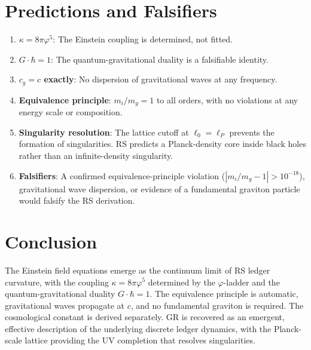 \documentclass[12pt,a4paper]{article}
\theoremstyle{definition}
\theoremstyle{remark}
\begin{document}
\section{Predictions and Falsifiers}
\label{sec:predictions}

\begin{enumerate}
  \item \textbf{$\kappa = 8\pi\varphi^5$}: The Einstein
  coupling is determined, not fitted.

  \item \textbf{$G \cdot \hbar = 1$}: The quantum-gravitational
  duality is a falsifiable identity.

  \item \textbf{$c_g = c$ exactly}: No dispersion of
  gravitational waves at any frequency.

  \item \textbf{Equivalence principle}: $m_i/m_g = 1$ to all
  orders, with no violations at any energy scale or
  composition.

  \item \textbf{Singularity resolution}: The lattice cutoff
  at $\ell_0 = \ell_P$ prevents the formation of
  singularities.  RS predicts a Planck-density core inside
  black holes rather than an infinite-density singularity.

  \item \textbf{Falsifiers}: A confirmed equivalence-principle
  violation ($|m_i/m_g - 1| > 10^{-18}$), gravitational
  wave dispersion, or evidence of a fundamental graviton
  particle would falsify the RS derivation.
\end{enumerate}

\section{Conclusion}
\label{sec:conclusion}

The Einstein field equations emerge as the continuum limit
of RS ledger curvature, with the coupling
$\kappa = 8\pi\varphi^5$ determined by the $\varphi$-ladder
and the quantum-gravitational duality $G \cdot \hbar = 1$.
The equivalence principle is automatic, gravitational waves
propagate at $c$, and no fundamental graviton is required.
The cosmological constant is derived separately.  GR is
recovered as an emergent, effective description of the
underlying discrete ledger dynamics, with the Planck-scale
lattice providing the UV completion that resolves
singularities.
\end{document}
